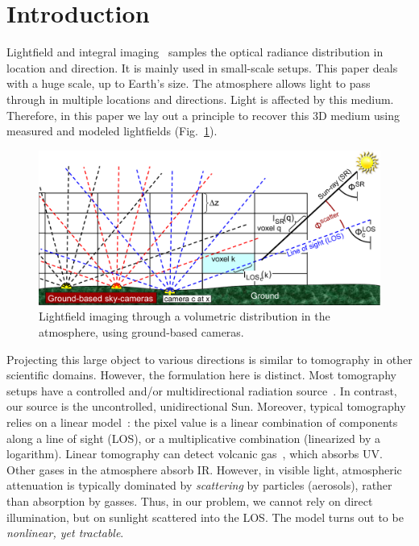 \documentclass[10pt,letterpaper]{article}
\newcommand{\yoavcomment}[1]{}
\renewcommand{\yoavcomment}[1]{#1} %
\begin{document}
{} 


\section{Introduction}
\label{sec:intro}

Lightfield and integral imaging~\cite{bishop,horstmeyer,kim,Ng1948}
samples the optical radiance distribution in location and
direction. It is mainly used in small-scale setups. This paper deals
with a huge scale, up to Earth's size.  The atmosphere allows light to
pass through in multiple locations and directions. Light is affected
by this medium. Therefore, in this paper we lay out a principle to
recover this 3D medium using measured and modeled lightfields
(Fig.~\ref{fig:groundgrid}).
\begin{figure}[t!]
  \begin{center}
    \yoavcomment{\includegraphics[width=\linewidth]{images/groundtomog24.pdf}}
  \end{center}
  \caption{\small Lightfield imaging through a volumetric distribution
    in the atmosphere, using ground-based cameras.}
  \label{fig:groundgrid}
\end{figure}
Projecting this large object to various directions is similar to
tomography in other scientific domains. However, the formulation here
is distinct. Most tomography setups have a controlled and/or
multidirectional radiation source~\cite{gorbunov,messer}. In contrast,
our source is the uncontrolled, unidirectional Sun. Moreover, typical
tomography relies on a linear model~\cite{gregson}: the pixel value is
a linear combination of components along a line of sight (LOS), or a
multiplicative combination (linearized by a logarithm). Linear
tomography can detect volcanic gas~\cite{wright}, which absorbs
UV. Other gases in the atmosphere absorb IR. However, in visible
light, atmospheric attenuation is typically dominated by {\em
  scattering} by particles (aerosols), rather than absorption by
gasses. Thus, in our problem, we cannot rely on direct illumination,
but on sunlight scattered into the LOS.  The model turns out to be
{\em nonlinear, yet tractable}.
\end{document}
